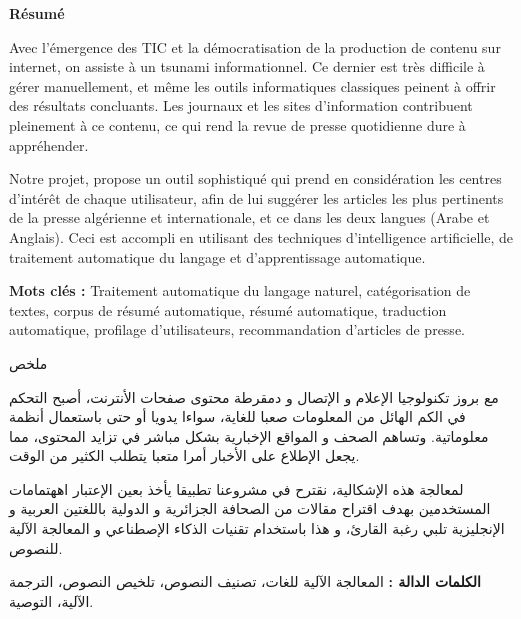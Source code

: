 \begin{center}
    \Large 
    \textbf{Résumé}
\end{center}
\setlength{\parindent}{0.5cm}
Avec l'émergence des TIC et la démocratisation de la production de contenu sur internet, on assiste à un tsunami informationnel. Ce dernier est très difficile à gérer manuellement, et même les outils informatiques classiques peinent à offrir des résultats concluants. Les journaux et les sites d'information contribuent pleinement à ce contenu, ce qui rend la revue de presse quotidienne dure à appréhender. 

Notre projet, propose un outil sophistiqué qui prend en considération les centres d'intérêt de chaque utilisateur, afin de lui suggérer les articles les plus pertinents de la presse algérienne et internationale, et ce dans les deux langues (Arabe et Anglais). Ceci est accompli en utilisant des techniques d'intelligence artificielle, de traitement automatique du langage et d'apprentissage automatique. 

\noindent
\textbf{Mots clés :} Traitement automatique du langage naturel, catégorisation de textes, corpus de résumé
automatique, résumé automatique, traduction automatique, profilage d'utilisateurs, recommandation d'articles de presse.  

\vspace*{0.8cm}

\begin{center}
    \Large 
    \begin{arab}
    ملخص
    \end{arab}
\end{center}
\begin{arab}
مع بروز تكنولوجيا الإعلام و الإتصال و دمقرطة محتوى صفحات الأنترنت، أصبح التحكم في الكم الهائل من المعلومات صعبا للغاية، سواءا يدويا أو حتى باستعمال أنظمة معلوماتية. وتساهم الصحف و المواقع الإخبارية بشكل مباشر في تزايد المحتوى، مما يجعل الإطلاع على الأخبار أمرا متعبا يتطلب الكثير من الوقت. 

لمعالجة هذه الإشكالية، نقترح في مشروعنا تطبيقا يأخذ بعين الإعتبار اههتمامات المستخدمين بهدف اقتراح مقالات من الصحافة الجزائرية و الدولية باللغتين العربية و الإنجليزية تلبي رغبة القارئ، و هذا باستخدام تقنيات الذكاء الإصطناعي و المعالجة الآلية للنصوص.

\textbf{الكلمات الدالة :} المعالجة الآلية للغات،  تصنيف النصوص، تلخيص النصوص، الترجمة الآلية، التوصية.  
\end{arab}

\vspace*{0.8cm}


